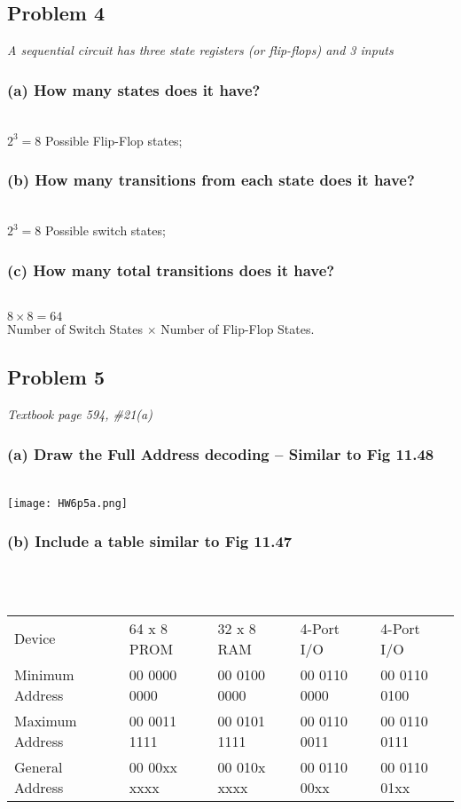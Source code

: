 \documentclass[a4paper,man,natbib]{apa6}
\begin{document}
\subsection{Problem 4}
\emph{A sequential circuit has three state registers (or flip-flops) and 3 inputs}
\\
\subsubsection{(a) How many states does it have?}~\\
$2^3=8$ Possible Flip-Flop states;
\subsubsection{(b) How many transitions from each state does it have?}~\\
$2^3=8$ Possible switch states;
\subsubsection{(c) How many total transitions does it have?}~\\
$8\times8=64$ \\
Number of Switch States $\times$ Number of Flip-Flop States. \\

\clearpage

\subsection{Problem 5}
\emph{Textbook page 594, \#21(a)}~\\
\subsubsection{(a) Draw the Full Address decoding – Similar to Fig 11.48 }~\\
\texttt{[image: HW6p5a.png]}
\subsubsection{(b) Include a table similar to Fig 11.47 }~\\
~\\
\singlespacing
\begin{tabular}{l l l l l}
	\hline
	Device      &  64 x 8 PROM &  32 x 8 RAM  &  4-Port I/O  & 4-Port I/O   \\
Minimum Address & 00 0000 0000 & 00 0100 0000 & 00 0110 0000 & 00 0110 0100 \\
Maximum Address & 00 0011 1111 & 00 0101 1111 & 00 0110 0011 & 00 0110 0111 \\
General Address & 00 00xx xxxx & 00 010x xxxx & 00 0110 00xx & 00 0110 01xx \\
	\hline
\end{tabular}
~\\
\doublespacing
\end{document}
